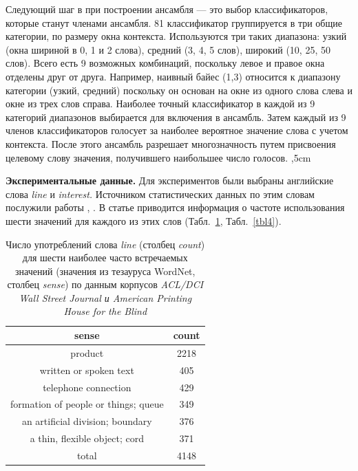 \documentclass{article}
\begin{document}
\begin{articletext}
Следующий шаг в \cite{Pedersen 2000} при построении ансамбля --- это выбор классификаторов, которые станут членами ансамбля. 81 классификатор группируется в три общие категории, по размеру окна контекста. Используются три таких диапазона: узкий (окна шириной в 0, 1 и 2 слова), средний (3, 4, 5 слов), широкий (10, 25, 50 слов). Всего есть 9 возможных комбинаций, поскольку левое и правое окна отделены друг от друга. Например, наивный байес (1,3) относится к диапазону категории (узкий, средний) поскольку он основан на окне из одного слова слева и окне из трех слов справа.  Наиболее точный классификатор в каждой из 9 категорий диапазонов выбирается для включения в ансамбль. Затем каждый из 9 членов классификаторов голосует за наиболее вероятное значение слова с учетом контекста. После этого ансамбль разрешает многозначность путем присвоения целевому слову значения, получившего наибольшее число голосов. 
,5cm

\textbf{Экспериментальные данные.} Для экспериментов были выбраны английские слова \textit{line} и \textit{interest.} Источником статистических данных по этим словам послужили работы \cite{Leacock 1993}, \cite{Bruce 1994}. В статье приводится информация о частоте использования шести значений для каждого из этих слов (Табл.~\ref{tbl3}, Табл.~\ref{tbl4}). 

\begin{table}[H]
\centering
\caption{Число употреблений слова \textit{line} (столбец \textit{count}) для шести наиболее часто встречаемых значений (значения из тезауруса WordNet, столбец \textit{sense}) по данным корпусов \textit{ACL/DCI Wall Street Journal и American Printing House for the Blind}}
\begin{tabular}{|c|c|}
\hline
sense & count\\
\hline
product & 2218\\
written or spoken text & 405\\
telephone connection & 429\\
formation of people or things; queue & 349\\
an artificial division; boundary & 376\\
a thin, flexible object; cord & 371\\
\hline
total & 4148\\
\hline
\end{tabular}
\label{tbl3}
\end{table}


\end{articletext}
\end{document}
